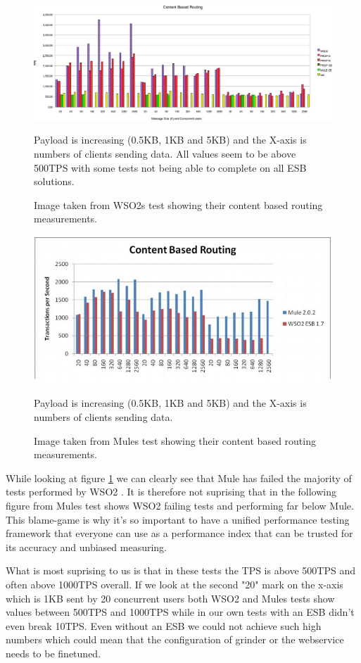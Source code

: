 \begin{figure}[H]
	\caption{Image taken from WSO2s test \cite{Perera07R3} showing their content based routing measurements.}
	\centerline{\includegraphics[scale=0.43]{img/WSO2_cbr_chart}}
	\label{fig:wso2_cbr}
	Payload is increasing (0.5KB, 1KB and 5KB) and the X-axis is numbers of clients sending data. 
	All values seem to be above 500TPS with some tests not being able to complete on all ESB solutions.
\end{figure}
\begin{figure}[H]
	\caption{Image taken from Mules test \cite{mulesoft08} showing their content based routing measurements.}
	\centerline{\includegraphics[scale=1]{img/MULE_cbr_chart}}
	\label{fig:mule_cbr}
	Payload is increasing (0.5KB, 1KB and 5KB) and the X-axis is numbers of clients sending data. 
\end{figure}
While looking at figure \ref{fig:wso2_cbr} we can clearly see that Mule has failed the majority of tests performed by WSO2 \cite{Perera07R3}. 
It is therefore not suprising that in the following figure from Mules test \cite{mulesoft08} shows WSO2 failing tests and performing far below Mule.
This blame-game is why it's so important to have a unified performance testing framework that everyone can use as a performance index that can be trusted for its accuracy and unbiased measuring.

What is most suprising to us is that in these tests the TPS is above 500TPS and often above 1000TPS overall. 
If we look at the second "20" mark on the x-axis which is 1KB sent by 20 concurrent users both WSO2 and Mules tests show values between 500TPS and 1000TPS while in our own tests with an ESB didn't even break 10TPS.
Even without an ESB we could not achieve such high numbers which could mean that the configuration of grinder or the webservice needs to be finetuned.

